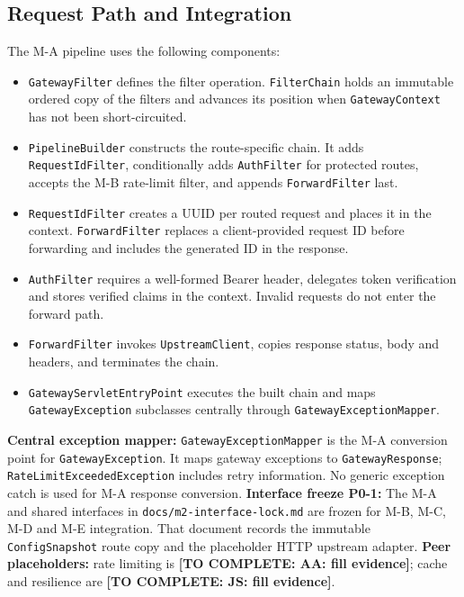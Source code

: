 \documentclass[12pt,a4paper]{article}
\newcommand{\cls}[1]{\nolinkurl{#1}}
\newcommand{\todo}[1]{\textcolor{red!70!black}{\textbf{[TO COMPLETE: #1]}}}
\begin{document}
\subsection{Request Path and Integration}
The M-A pipeline uses the following components:
\begin{itemize}[leftmargin=*]
\item \cls{GatewayFilter} defines the filter operation. \cls{FilterChain} holds an immutable ordered copy of the filters and advances its position when \cls{GatewayContext} has not been short-circuited.
\item \cls{PipelineBuilder} constructs the route-specific chain. It adds \cls{RequestIdFilter}, conditionally adds \cls{AuthFilter} for protected routes, accepts the M-B rate-limit filter, and appends \cls{ForwardFilter} last.
\item \cls{RequestIdFilter} creates a UUID per routed request and places it in the context. \cls{ForwardFilter} replaces a client-provided request ID before forwarding and includes the generated ID in the response.
\item \cls{AuthFilter} requires a well-formed Bearer header, delegates token verification and stores verified claims in the context. Invalid requests do not enter the forward path.
\item \cls{ForwardFilter} invokes \cls{UpstreamClient}, copies response status, body and headers, and terminates the chain.
\item \cls{GatewayServletEntryPoint} executes the built chain and maps \cls{GatewayException} subclasses centrally through \cls{GatewayExceptionMapper}.
\end{itemize}
\textbf{Central exception mapper:} \cls{GatewayExceptionMapper} is the M-A conversion point for \cls{GatewayException}. It maps gateway exceptions to \cls{GatewayResponse}; \cls{RateLimitExceededException} includes retry information. No generic exception catch is used for M-A response conversion.
\textbf{Interface freeze P0-1:} The M-A and shared interfaces in \cls{docs/m2-interface-lock.md} are frozen for M-B, M-C, M-D and M-E integration. That document records the immutable \cls{ConfigSnapshot} route copy and the placeholder HTTP upstream adapter.
\textbf{Peer placeholders:} rate limiting is \todo{AA: fill evidence}; cache and resilience are \todo{JS: fill evidence}.
\end{document}
